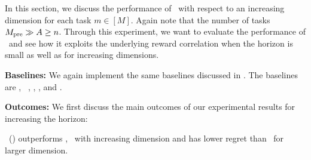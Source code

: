 In this section, we discuss the performance of \pred\ with respect to an increasing dimension for each task $m\in [M]$. Again note that the number of tasks $M_{\text{pre}} \gg A \geq n$.
%
%
Through this experiment, we want to evaluate the performance of \pred\ and see how it exploits the underlying reward correlation when the horizon is small as well as for increasing dimensions.


\textbf{Baselines:} We again implement the same baselines discussed in . The baselines are \pred, \predt\ \dptg, \ad, \ts, and \linucb. 


\textbf{Outcomes:} We first discuss the main outcomes of our experimental results for increasing the horizon:

\begin{tcolorbox}
\customfinding \pred\ (\gt) outperforms \dptg, \ad\ with increasing dimension and has lower regret than \linucb\ for larger dimension.
\end{tcolorbox}




